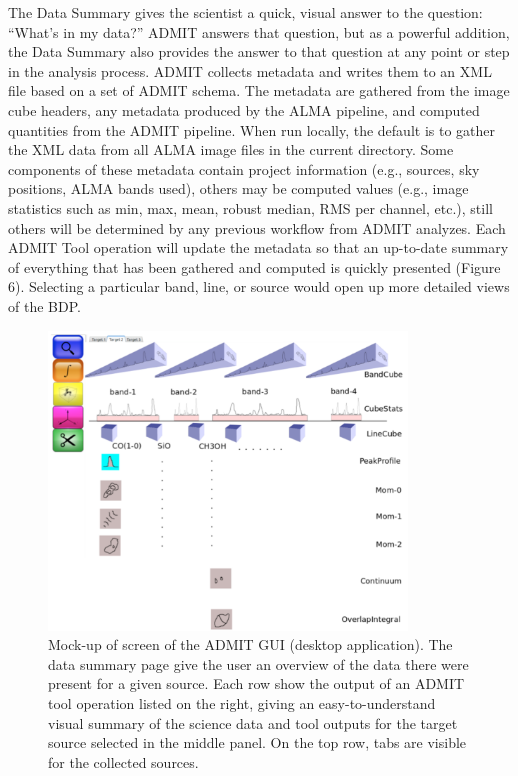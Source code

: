 The Data Summary gives the scientist a quick, visual answer to the question: 
``What’s in my data?''  ADMIT answers that question, but as a powerful addition, 
the Data Summary also provides the answer to that question at any point or 
step in the analysis process.  ADMIT collects metadata and writes them to 
an XML file based on a set of ADMIT schema. The metadata are gathered from the 
image cube headers, any metadata produced by the ALMA pipeline, and computed 
quantities from the ADMIT pipeline. When run locally, the default is to gather 
the XML data from all ALMA image files in the current directory. Some components 
of these metadata contain project information (e.g., sources, sky positions, 
ALMA bands used), others may be computed values (e.g., image statistics such as 
min, max, mean, robust median, RMS per channel, etc.), still others will be 
determined by any previous workflow from ADMIT analyzes. Each ADMIT Tool 
operation will update the metadata so that an up-to-date summary of everything 
that has been gathered and computed is quickly presented (Figure 6).  
Selecting a particular band, line, or source would open up more detailed 
views of the BDP.

\begin{figure}[t]
\centering
\includegraphics[width=0.85\textwidth]{overview.png}
\hspace{0.03in}
\caption{\small \setlength{\baselineskip}{0.85\baselineskip}
Mock-up of screen of the ADMIT GUI (desktop application).
The data summary page give the user an overview of the data there were
present for a given source. Each row show the output of an ADMIT tool
operation listed on the right, giving an easy-to-understand visual summary
of the science data and tool outputs for the target source selected in the
middle panel. On the top row, tabs are visible for the collected sources.
  }
\label{fig:overview}
\end{figure}

